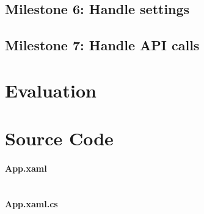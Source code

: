 \documentclass[a4paper]{report}
\begin{document}
\section{Milestone 6: Handle settings}

\section{Milestone 7: Handle API calls}

\chapter{Evaluation}

\chapter{Source Code}

\subsubsection{App.xaml}

\inputminted{xml}{"../src/Algorithm Dynamics/App.xaml"}

\subsubsection{App.xaml.cs}

\inputminted{csharp}{"../src/Algorithm Dynamics/App.xaml.cs"}


\printbibliography[
    heading=bibintoc,
    title={Bibliography}
]
\end{document}
